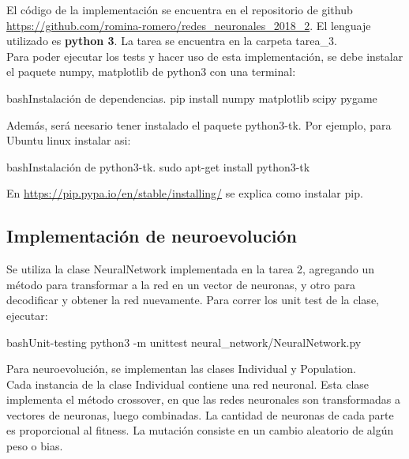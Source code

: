 \documentclass[letterpaper,11pt]{article} %
\begin{document}
El código de la implementación se encuentra en el repositorio de github \url{https://github.com/romina-romero/redes_neuronales_2018_2}. El lenguaje utilizado es \textbf{python 3}. La tarea se encuentra en la carpeta tarea\_3. \\

Para poder ejecutar los tests y hacer uso de esta implementación, se debe instalar el paquete numpy, matplotlib de python3 con una terminal:

\begin{sourcecode}[\label{instalacion}]{bash}{Instalación de dependencias.}
pip install numpy matplotlib scipy pygame
\end{sourcecode}

Además, será neesario tener instalado el paquete python3-tk. Por ejemplo, para Ubuntu linux instalar asi:

\begin{sourcecode}[\label{instalacion2}]{bash}{Instalación de python3-tk.}
sudo apt-get install python3-tk
\end{sourcecode}


En \url{https://pip.pypa.io/en/stable/installing/} se explica como instalar pip.\\

\subsection{Implementación de neuroevolución}

Se utiliza la clase NeuralNetwork implementada en la tarea 2, agregando un método para transformar a la red en un vector de neuronas, y otro para decodificar y obtener la red nuevamente. Para correr los unit test de la clase, ejecutar:

\begin{sourcecode}[\label{unittest}]{bash}{Unit-testing}
python3 -m unittest neural_network/NeuralNetwork.py
\end{sourcecode}



Para neuroevolución, se implementan las clases Individual y Population.\\ 

Cada instancia de la clase Individual contiene una red neuronal. Esta clase implementa el método crossover, en que las redes neuronales son transformadas a vectores de neuronas, luego combinadas. La cantidad de neuronas de cada parte es proporcional al fitness. La mutación consiste en un cambio aleatorio de algún peso o bias.\\
\end{document}
